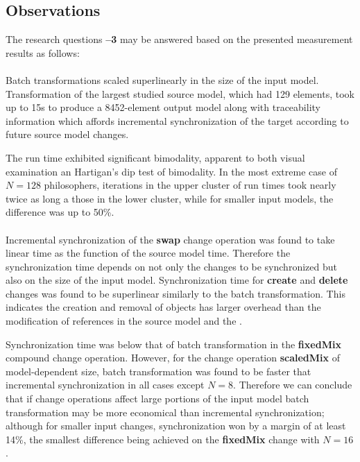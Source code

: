 \subsection{Observations}

The research questions \textbf{--3} may be answered based on the presented measurement results as follows:

\paragraph{} Batch transformations scaled superlinearly in the size of the input model. Transformation of the largest studied source model, which had 129 elements, took up to 15\thinspace s to produce a 8452-element output model along with traceability information which affords incremental synchronization of the target  according to future source model changes.

The run time exhibited significant bimodality, apparent to both visual examination an Hartigan's dip test of bimodality. In the most extreme case of \(N = 128\) philosophers, iterations in the upper cluster of run times took nearly twice as long a those in the lower cluster, while for smaller input models, the difference was up to 50\%.

\paragraph{} Incremental synchronization of the \textbf{swap} change operation was found to take linear time as the function of the source model time. Therefore the synchronization time depends on not only the changes to be synchronized but also on the size of the input model. Synchronization time for \textbf{create} and \textbf{delete} changes was found to be superlinear similarly to the batch transformation. This indicates the creation and removal of objects has larger overhead than the modification of references in the source model and the .

Synchronization time was below that of batch transformation in the \textbf{fixed\-Mix} compound change operation. However, for the change operation \textbf{scaled\-Mix} of model-dependent size, batch transformation was found to be faster that incremental synchronization in all cases except \(N = 8\). Therefore we can conclude that if change operations affect large portions of the input model batch transformation may be more economical than incremental synchronization; although for smaller input changes, synchronization won by a margin of at least 14\%, the smallest difference being achieved on the \textbf{fixed\-Mix} change with \(N = 16\).

